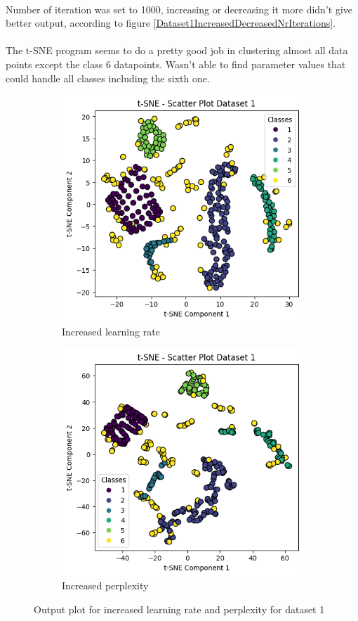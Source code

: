 \documentclass[12pt]{report}
\begin{document}
	\\
	Number of iteration was set to 1000, increasing or decreasing it more didn't give better output, according to figure \ref{Dataset1IncreasedDecreasedNrIterations}.\\
	\\
	The t-SNE program seems to do a pretty good job in clustering almost all data points except the class 6 datapoints. Wasn't able to find parameter values that could handle all classes including the sixth one. 
	\newpage
	\begin{figure}[H]
		\centering
		\begin{subfigure}{.5\textwidth}
			\centering
			\includegraphics[width=.8\linewidth]{../t-SNE/OutputPlot/Dataset1OutputPlot/Dataset1 increased learningRate.png}
			\caption{Increased learning rate}
			\label{Dataset1IncreasedLearning}
		\end{subfigure}%
		\begin{subfigure}{.5\textwidth}
			\centering
			\includegraphics[width=.8\linewidth]{../t-SNE/OutputPlot/Dataset1OutputPlot/Dataset1 increased perplexity.png}
			\caption{Increased perplexity}
			\label{dataset1IncreasedPerplexity}
		\end{subfigure}
		\caption{Output plot for increased learning rate and perplexity for dataset 1}
		\label{Dataset1IncreasedLearningperplexity}
	\end{figure}
\end{document}
